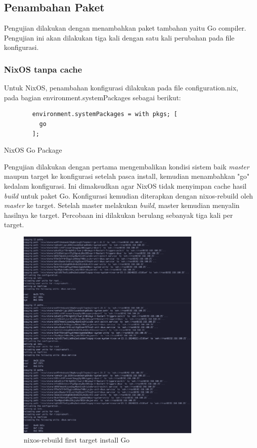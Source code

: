 \documentclass[10pt,]{report}
\newenvironment{code}{\captionsetup{type=listing}}{\vspace{3mm}}
\begin{document}
\begin{adjustwidth}{20pt}{}
	\subsection{Penambahan Paket}
	\begin{adjustwidth}{20pt}{}
		Pengujian dilakukan dengan menambahkan paket tambahan yaitu Go compiler.
		Pengujian ini akan dilakukan tiga kali dengan satu kali perubahan pada file
		konfigurasi.
	\end{adjustwidth}
	\subsubsection{NixOS tanpa cache}
	\begin{adjustwidth}{20pt}{}
		Untuk NixOS, penambahan konfigurasi dilakukan pada file configuration.nix, pada
		bagian environment.systemPackages sebagai berikut:
		\begin{code}
			\begin{verbatim}
        environment.systemPackages = with pkgs; [
          go
        ];
      \end{verbatim}
			\caption{NixOS Go Package}
		\end{code}
		Pengujian dilakukan dengan pertama mengembalikan kondisi sistem baik
		\textit{master} maupun target ke konfigurasi setelah pasca install,
		kemudian menambahkan "go" kedalam konfigurasi. Ini dimaksudkan agar NixOS tidak
		menyimpan cache hasil \textit{build} untuk paket Go. Konfigurasi kemudian
		diterapkan dengan nixos-rebuild oleh \textit{master} ke target. Setelah
		master melakukan \textit{build}, master kemudian menyalin hasilnya ke
		target. Percobaan ini dilakukan berulang sebanyak tiga kali per target.
	\end{adjustwidth}
	\begin{figure}[H]
		\begin{center}
			\includegraphics[width=0.8\textwidth]{images/nix-target/nix-go-25-com.png}
		\end{center}
		\caption{nixos-rebuild first target install Go}
	\end{figure}


\end{adjustwidth}
\end{document}
